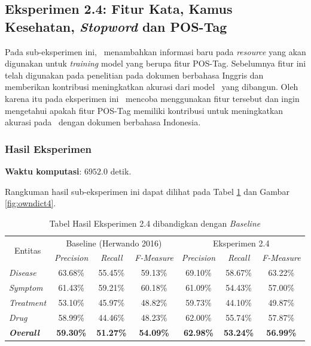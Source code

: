 	\subsection{Eksperimen 2.4: Fitur Kata, Kamus Kesehatan, \textit{Stopword} dan POS-Tag}\label{eks:subekspostag}
	Pada sub-eksperimen ini, \saya~menambahkan informasi baru pada \textit{resource} yang akan digunakan untuk \textit{training} model yang berupa fitur POS-Tag. Sebelumnya fitur ini telah digunakan pada penelitian \cite{abacha2011medical} pada dokumen berbahasa Inggris dan memberikan kontribusi meningkatkan akurasi dari model \mer~yang dibangun. Oleh karena itu pada eksperimen ini \saya~mencoba menggunakan fitur tersebut dan ingin mengetahui apakah fitur POS-Tag memiliki kontribusi untuk meningkatkan akurasi pada \mer~dengan dokumen berbahasa Indonesia. 
	
	\subsubsection{Hasil Eksperimen}
	\textbf{Waktu komputasi}: $ 6952.0 $ detik.
	
	Rangkuman hasil sub-eksperimen ini dapat dilihat pada Tabel \ref{table:owndict4} dan Gambar \ref{fig:owndict4}.
	
	\begin{table}
		\centering
		\caption{Tabel Hasil Eksperimen 2.4 dibandigkan dengan \textit{Baseline}}
		\begin{tabular}{|l|c|c|c|c|c|c|}
			\hline
			\multicolumn{1}{|c|}{\multirow{2}{*}{Entitas}} & \multicolumn{3}{c|}{Baseline (Herwando 2016)} & \multicolumn{3}{c|}{Eksperimen 2.4} \\ \cline{2-7} 
			\multicolumn{1}{|c|}{} & \textit{Precision} & \textit{Recall} & \textit{F-Measure} & \textit{Precision} & \textit{Recall} & \textit{F-Measure} \\ \hline
			\textit{Disease} & 63.68\% & 55.45\% & 59.13\% & 69.10\% & 58.67\% & 63.22\% \\ \hline
			\textit{Symptom} & 61.43\% & 59.21\% & 60.18\% & 61.09\% & 54.43\% & 57.00\% \\ \hline
			\textit{Treatment} & 53.10\% & 45.97\% & 48.82\% & 59.73\% & 44.10\% & 49.87\% \\ \hline
			\textit{Drug} & 58.99\% & 44.46\% & 48.23\% & 62.00\% & 55.74\% & 57.87\% \\ \hline
			\textit{\textbf{Overall}} & \textbf{59.30\%} & \textbf{51.27\%} & \textbf{54.09\%} & \textbf{62.98\%} & \textbf{53.24\%} & \textbf{56.99\%} \\ \hline
		\end{tabular}
		\label{table:owndict4}
	\end{table}
	

